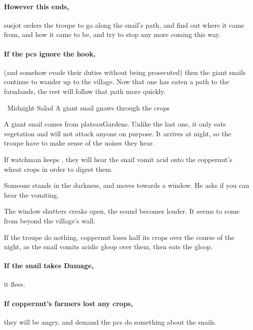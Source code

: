 \paragraph{However this ends,}
\gls{susjot} orders the troupe to go along the snail's path, and find out where it came from, and how it came to be, and try to stop any more coming this way.

\paragraph{If the \glspl{pc} ignore the hook,}
(and somehow evade their duties without being prosecuted) then the giant snails continue to wander up to the \gls{village}.
Now that one has eaten a path to the farmlands, the rest will follow that path more quickly.

{~Midnight Salad}%
{A giant snail gnaws through the crops}%

A giant snail comes from \gls{plateauGardens}.
Unlike the last one, it only eats vegetation and will not attack anyone on purpose.
It arrives at night, so the troupe have to make sense of the noises they hear.

If  watchman keeps , they will hear the snail vomit acid onto the \gls{coppernut}'s wheat crops in order to digest them.

\begin{boxtext}
  Someone stands in the darkness, and moves towards a window.
  He asks if you can hear the vomiting.

  The window shutters creaks open, the sound becomes louder.
  It seems to come from beyond the \gls{village}'s wall.
\end{boxtext}

If the troupe do nothing, \gls{coppernut} loses half its crops over the course of the night, as the snail vomits acidic gloop over them, then eats the gloop.

\paragraph{If the snail takes Damage,}
it flees.

\paragraph{If \gls{coppernut}'s farmers lost any crops,}
they will be angry, and demand the \glspl{pc} do something about the snails.


